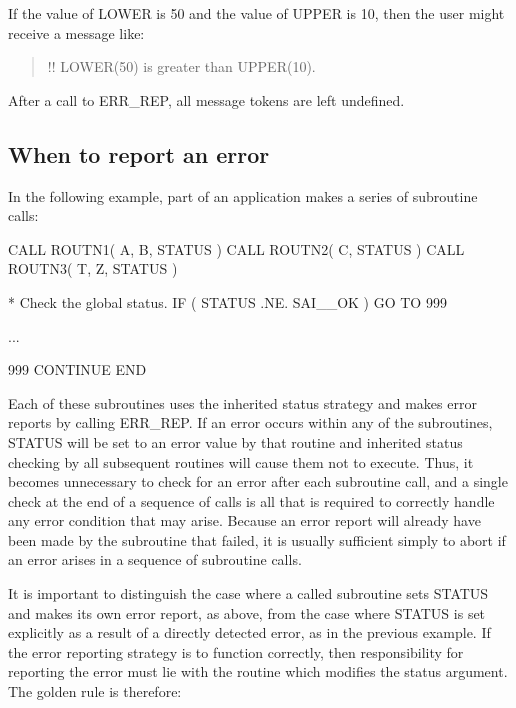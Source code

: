 \documentclass[twoside,11pt]{starlink}
\begin{document}
If the value of LOWER is 50 and the value of UPPER is 10, then the user
might receive a message like:

\begin {quote}
\begin {small}
\begin{terminalv}
!! LOWER(50) is greater than UPPER(10).
\end{terminalv}
\end {small}
\end {quote}

After a call to ERR\_REP, all message tokens are left undefined.


\subsection{When to report an error \label{when_sect}}

In the following example, part of an application makes a series of subroutine
calls:

\begin {small}
\begin{terminalv}
      CALL ROUTN1( A, B, STATUS )
      CALL ROUTN2( C, STATUS )
      CALL ROUTN3( T, Z, STATUS )

*  Check the global status.
      IF ( STATUS .NE. SAI__OK ) GO TO 999

      ...

999   CONTINUE
      END
\end{terminalv}
\end {small}

Each of these subroutines uses the inherited status strategy and makes
error reports by calling ERR\_REP.
If an error occurs within any of the subroutines, STATUS will be set
to an error value by that routine and inherited status checking by all
subsequent routines will cause them not to execute.
Thus, it becomes unnecessary to check for an error after each subroutine
call, and a single check at the end of a sequence of calls is all that is
required to correctly handle any error condition that may arise.
Because an error report will already have been made by the subroutine that
failed, it is usually sufficient simply to abort if an error arises in a
sequence of subroutine calls.

It is important to distinguish the case where a called subroutine sets STATUS
and makes its own error report, as above, from the case where STATUS is set
explicitly as a result of a directly detected error, as in the previous
example.
If the error reporting strategy is to function correctly, then responsibility
for reporting the error must lie with the routine which modifies the status
argument.
The golden rule is therefore:
\end{document}
